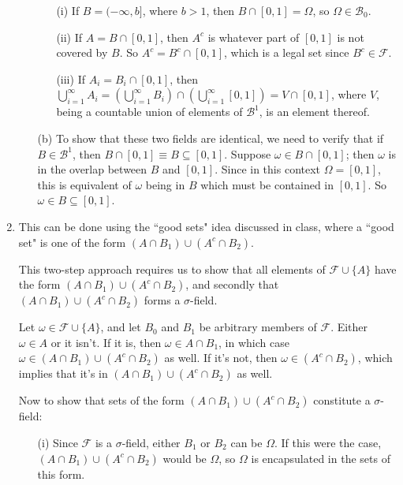 \documentclass[12pt]{article}
\begin{document}
\begin{enumerate}
\begin{itemize}
\begin{itemize}
\item[(i)] If $B=(-\infty,b]$, where $b>1$, then $B \cap [0,1] = \Omega$, so $\Omega \in \mathcal{B}_0$.

\item[(ii)] If $A=B \cap [0,1]$, then $A^c$ is whatever part of $[0,1]$ is not covered by $B$. So $A^c=B^c \cap [0,1]$, which is a legal set since $B^c\in\mathcal{F}$.

\item[(iii)] If $A_i=B_i\cap[0,1]$, then $\bigcup^\infty_{i=1}A_i= \left( \bigcup^\infty_{i=1} B_i \right)\cap \left( \bigcup^\infty_{i=1} [0,1] \right) = V \cap [0,1]$, where $V$, being a countable union of elements of $\mathcal{B}^1$, is an element thereof.

\end{itemize}

\item[(b)] To show that these two fields are identical, we need to verify that if $B \in \mathcal{B}^1$, then $B \cap [0,1] \equiv B \subseteq [0,1]$. Suppose $\omega \in B \cap [0,1]$; then $\omega$ is in the overlap between $B$ and $[0,1]$. Since in this context $\Omega=[0,1]$, this is equivalent of $\omega$ being in $B$ which must be contained in $[0,1]$. So $\omega \in B \subseteq [0,1]$.

\end{itemize}

\item This can be done using the ``good sets" idea discussed in class, where a ``good set" is one of the form $(A \cap B_1)\cup(A^c \cap B_2)$. 

This two-step approach requires us to show that all elements of $\mathcal{F} \cup \{A\}$ have the form $(A \cap B_1)\cup(A^c \cap B_2)$, and secondly that $(A \cap B_1)\cup(A^c \cap B_2)$ forms a $\sigma$-field.

Let $\omega \in \mathcal{F} \cup \{A\}$, and let $B_0$ and $B_1$ be arbitrary members of $\mathcal{F}$. Either $\omega \in A$ or it isn't. If it is, then $\omega \in A\cap B_1$, in which case $\omega \in (A \cap B_1)\cup(A^c \cap B_2)$ as well. If it's not, then $\omega \in (A^c \cap B_2)$, which implies that it's in $(A \cap B_1)\cup(A^c \cap B_2)$ as well.

Now to show that sets of the form $(A \cap B_1)\cup(A^c \cap B_2)$ constitute a $\sigma$-field:

\begin{itemize}
\item[(i)] Since $\mathcal{F}$ is a $\sigma$-field, either $B_1$ or $B_2$ can be $\Omega$. If this were the case, $(A \cap B_1)\cup(A^c \cap B_2)$ would be $\Omega$, so $\Omega$ is encapsulated in the sets of this form.


\end{itemize}
\end{enumerate}
\end{document}
